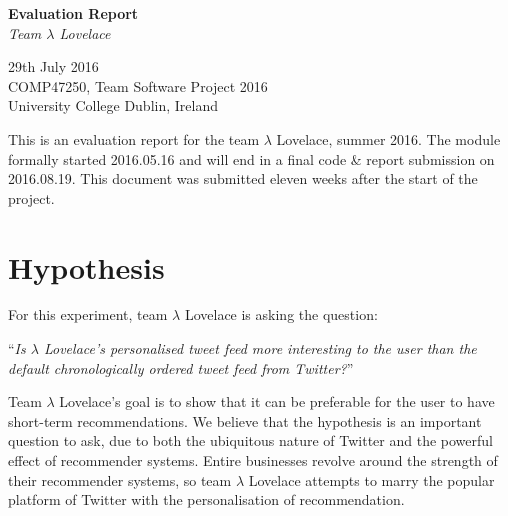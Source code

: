 \documentclass{article}
\begin{document}
\begin{center}
	{\LARGE \textbf{Evaluation Report}} \\
	\vspace{0.5em}
	\textsl{Team $\lambda$ Lovelace}
\end{center}

\vspace{0.5em}

\begin{center}
	29th July 2016 \\
	COMP47250, Team Software Project 2016 \\ 
	University College Dublin, Ireland \\
\end{center}

\vspace{0.5em}



\noindent This is an evaluation report for the team $\lambda$ Lovelace, summer 2016. The module formally started 2016.05.16 and will end in a final code \& report submission on 2016.08.19. This document was submitted eleven weeks after the start of the project.


\section{Hypothesis}
%
%
For this experiment, team $\lambda$ Lovelace is asking the question:

\begin{center}
    ``\textit{Is $\lambda$ Lovelace's personalised tweet feed more interesting to the user than the default chronologically ordered tweet feed from Twitter?}''
\end{center}

Team $\lambda$ Lovelace's goal is to show that it can be preferable for the user to have short-term recommendations. We believe that the hypothesis is an important question to ask, due to both the ubiquitous nature of Twitter and the powerful effect of recommender systems. Entire businesses revolve around the strength of their recommender systems, so team $\lambda$ Lovelace attempts to marry the popular platform of Twitter with the personalisation of recommendation.
\end{document}

